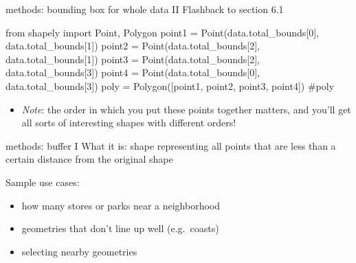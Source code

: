 \documentclass[
  ignorenonframetext,
]{beamer}
\newenvironment{Shaded}{\begin{snugshade}}{\end{snugshade}}
\newcommand{\CommentTok}[1]{\textcolor[rgb]{0.37,0.37,0.37}{#1}}
\newcommand{\DecValTok}[1]{\textcolor[rgb]{0.68,0.00,0.00}{#1}}
\newcommand{\ImportTok}[1]{\textcolor[rgb]{0.00,0.46,0.62}{#1}}
\newcommand{\NormalTok}[1]{\textcolor[rgb]{0.00,0.23,0.31}{#1}}
\newcommand{\OperatorTok}[1]{\textcolor[rgb]{0.37,0.37,0.37}{#1}}
\providecommand{\tightlist}{%
  \setlength{\itemsep}{0pt}\setlength{\parskip}{0pt}}\usepackage{longtable,booktabs,array}
\begin{document}
\begin{frame}[fragile]{methods: bounding box for whole data II}
\label{methods-bounding-box-for-whole-data-ii}
Flashback to section 6.1

\begin{Shaded}
\begin{Highlighting}[]
\ImportTok{from}\NormalTok{ shapely }\ImportTok{import}\NormalTok{ Point, Polygon}
\NormalTok{point1 }\OperatorTok{=}\NormalTok{ Point(data.total\_bounds[}\DecValTok{0}\NormalTok{], data.total\_bounds[}\DecValTok{1}\NormalTok{])}
\NormalTok{point2 }\OperatorTok{=}\NormalTok{ Point(data.total\_bounds[}\DecValTok{2}\NormalTok{], data.total\_bounds[}\DecValTok{1}\NormalTok{])}
\NormalTok{point3 }\OperatorTok{=}\NormalTok{ Point(data.total\_bounds[}\DecValTok{2}\NormalTok{], data.total\_bounds[}\DecValTok{3}\NormalTok{])}
\NormalTok{point4 }\OperatorTok{=}\NormalTok{ Point(data.total\_bounds[}\DecValTok{0}\NormalTok{], data.total\_bounds[}\DecValTok{3}\NormalTok{])}
\NormalTok{poly }\OperatorTok{=}\NormalTok{ Polygon([point1, point2, point3, point4])}
\CommentTok{\#poly}
\end{Highlighting}
\end{Shaded}

\begin{itemize}
\tightlist
\item
  \emph{Note}: the order in which you put these points together matters,
  and you'll get all sorts of interesting shapes with different orders!
\end{itemize}
\end{frame}

\begin{frame}{methods: buffer I}
\label{methods-buffer-i}
What it is: shape representing all points that are less than a certain
distance from the original shape

Sample use cases:

\begin{itemize}
\tightlist
\item
  how many stores or parks near a neighborhood
\item
  geometries that don't line up well (e.g.~coasts)
\item
  selecting nearby geometries
\end{itemize}
\end{frame}
\end{document}
